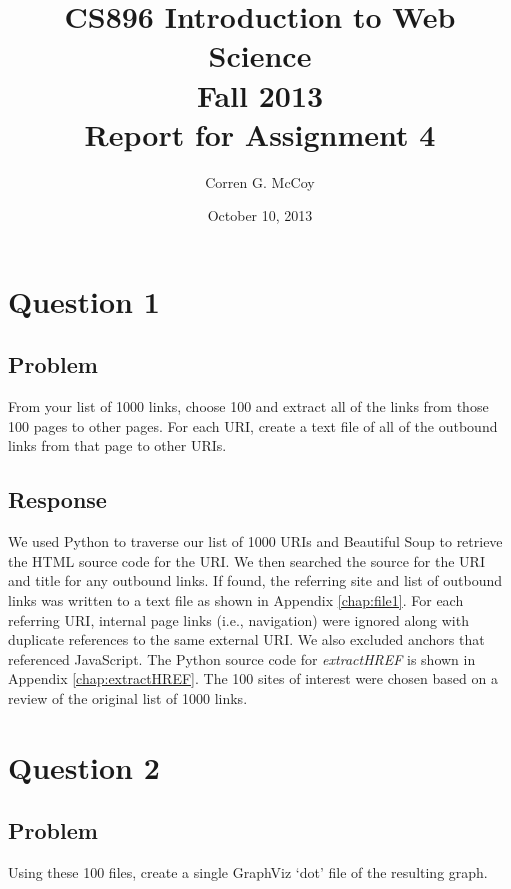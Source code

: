 \documentclass[letterpaper,11pt]{report}
\begin{document}
 
\begin{savenotes}
\pagestyle{plain}
\title{CS896 Introduction to Web Science\\Fall 2013\\Report for Assignment 4}
\author{Corren G. McCoy}
 
\date{October 10, 2013}
\maketitle

\renewcommand*\thesection{\arabic{section}}
\setcounter{section}{0}

\setcounter{tocdepth}{4}
\tableofcontents
 \listoffigures
\newpage


\section{Question 1}
\subsection{Problem}From your list of 1000 links, choose 100 and extract all of the links from those 100 pages to other pages. For each URI, create a text file of all of the outbound links from that page to other URIs.
\subsection{Response}We used Python to traverse our list of 1000 URIs and Beautiful Soup to retrieve the HTML source code for the URI. We then searched the source for the URI and title for any outbound links. If found, the referring site and list of outbound links was written to a text file as shown in Appendix \ref{chap:file1}.  For each referring URI, internal page links (i.e., navigation) were ignored along with duplicate references to the same external URI. We also excluded anchors that referenced JavaScript. The Python source code for \emph{extractHREF} is shown in Appendix \ref{chap:extractHREF}. The 100 sites of interest were chosen based on a review of the original list of 1000 links.

\section{Question 2}
\subsection{Problem}Using these 100 files, create a single GraphViz `dot' file of the resulting graph.

\end{savenotes}
\end{document}
